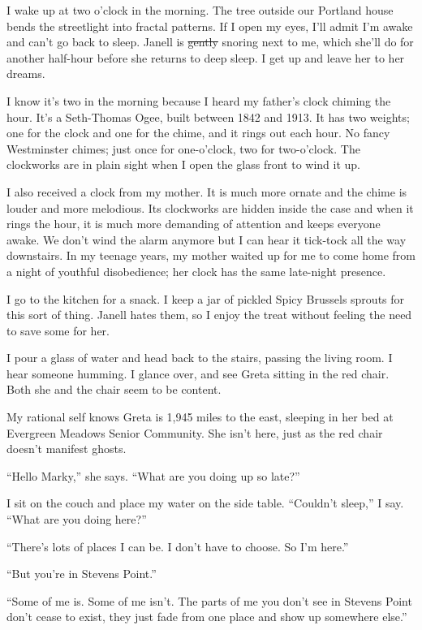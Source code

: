\documentclass[
  letterpaper,
  DIV=11,
  numbers=noendperiod]{scrreprt}
\begin{document}

I wake up at two o'clock in the morning. The tree outside our Portland
house bends the streetlight into fractal patterns. If I open my eyes,
I'll admit I'm awake and can't go back to sleep. Janell is \st{gently}
snoring next to me, which she'll do for another half-hour before she
returns to deep sleep. I get up and leave her to her dreams.

I know it's two in the morning because I heard my father's clock chiming
the hour. It's a Seth-Thomas Ogee, built between 1842 and 1913. It has
two weights; one for the clock and one for the chime, and it rings out
each hour. No fancy Westminster chimes; just once for one-o'clock, two
for two-o'clock. The clockworks are in plain sight when I open the glass
front to wind it up.

I also received a clock from my mother. It is much more ornate and the
chime is louder and more melodious. Its clockworks are hidden inside the
case and when it rings the hour, it is much more demanding of attention
and keeps everyone awake. We don't wind the alarm anymore but I can hear
it tick-tock all the way downstairs. In my teenage years, my mother
waited up for me to come home from a night of youthful disobedience; her
clock has the same late-night presence.

I go to the kitchen for a snack. I keep a jar of pickled Spicy Brussels
sprouts for this sort of thing. Janell hates them, so I enjoy the treat
without feeling the need to save some for her.

I pour a glass of water and head back to the stairs, passing the living
room. I hear someone humming. I glance over, and see Greta sitting in
the red chair. Both she and the chair seem to be content.

My rational self knows Greta is 1,945 miles to the east, sleeping in her
bed at Evergreen Meadows Senior Community. She isn't here, just as the
red chair doesn't manifest ghosts.

``Hello Marky,'' she says. ``What are you doing up so late?''

I sit on the couch and place my water on the side table. ``Couldn't
sleep,'' I say. ``What are you doing here?''

``There's lots of places I can be. I don't have to choose. So I'm
here.''

``But you're in Stevens Point.''

``Some of me is. Some of me isn't. The parts of me you don't see in
Stevens Point don't cease to exist, they just fade from one place and
show up somewhere else.''
\end{document}
